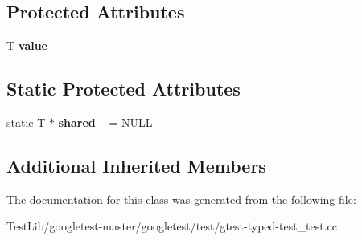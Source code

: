 \subsection*{Protected Attributes}
\begin{DoxyCompactItemize}
\item 
\mbox{\label{classCommonTest_ae59c4abcb833625a7baeb2048531ebec}} 
T {\bfseries value\+\_\+}
\end{DoxyCompactItemize}
\subsection*{Static Protected Attributes}
\begin{DoxyCompactItemize}
\item 
\mbox{\label{classCommonTest_a52368ce1e65a865db9bdccbcc2cedaac}} 
static T $\ast$ {\bfseries shared\+\_\+} = N\+U\+LL
\end{DoxyCompactItemize}
\subsection*{Additional Inherited Members}


The documentation for this class was generated from the following file\+:\begin{DoxyCompactItemize}
\item 
Test\+Lib/googletest-\/master/googletest/test/gtest-\/typed-\/test\+\_\+test.\+cc\end{DoxyCompactItemize}
